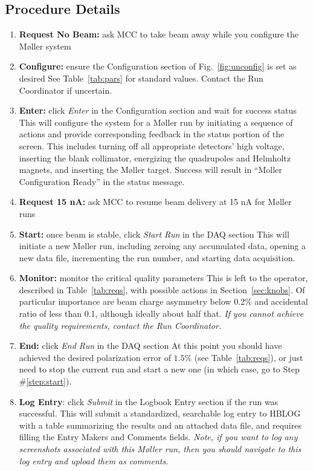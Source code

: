 \documentclass[amsmath,amssymb,notitlepage,12pt]{revtex4}
\begin{document}
\subsection{Procedure Details}
\begin{enumerate}
    \item {\bf Request No Beam:}  ask MCC to take beam away while you configure the M{\o}ller system
    \item {\bf Configure:}  ensure the Configuration section of Fig.~\ref{fig:unconfig} is set as desired
        \subitem
        See Table~\ref{tab:pars} for standard values.  Contact the Run Coordinator if uncertain.
\item {\bf Enter:} click {\em Enter} in the Configuration section and wait for success status
    \subitem This will configure the system for a M{\o}ller run by initiating a sequence of actions and provide corresponding feedback in the status portion of the screen.  This includes turning off all appropriate detectors' high voltage, inserting the blank collimator, energizing the quadrupoles and Helmholtz magnets, and inserting the M{\o}ller target.  Success will result in ``Moller Configuration Ready'' in the status message.
\item {\bf Request 15 nA:} \label{step:beam} ask MCC to resume beam delivery at 15 nA for M{\o}ller runs
\item {\bf Start:} \label{step:start} once beam is stable, click {\em Start Run} in the DAQ section
    \subitem This will initiate a new M{\o}ller run, including zeroing any accumulated data, opening a new data file, incrementing the run number, and starting data acquisition.
\item {\bf Monitor:} monitor the critical quality parameters
    \subitem This is left to the operator, described in Table~\ref{tab:reqs}, with possible actions in Section~\ref{sec:knobs}.  Of particular importance are beam charge asymmetry below 0.2\% and accidental ratio of less than 0.1, although ideally about half that.  {\em If you cannot achieve the quality requirements, contact the Run Coordinator.}
\item {\bf End:} click {\em End Run} in the DAQ section
    \subitem At this point you should have achieved the desired polarization error of $1.5\%$ (see Table~\ref{tab:reqs}), or just need to stop the current run and start a new one (in which case, go to Step \#\ref{step:start}).
\item {\bf Log Entry}: click {\em Submit} in the Logbook Entry section if the run was successful. 
    \subitem This will submit a standardized, searchable log entry to HBLOG with a table summarizing the results and an attached data file, and requires filling the Entry Makers and Comments fields.  {\em Note, if you want to log any screenshots associated with this M{\o}ller run, then you should navigate to this log entry and upload them as comments}.

\end{enumerate}
\end{document}
